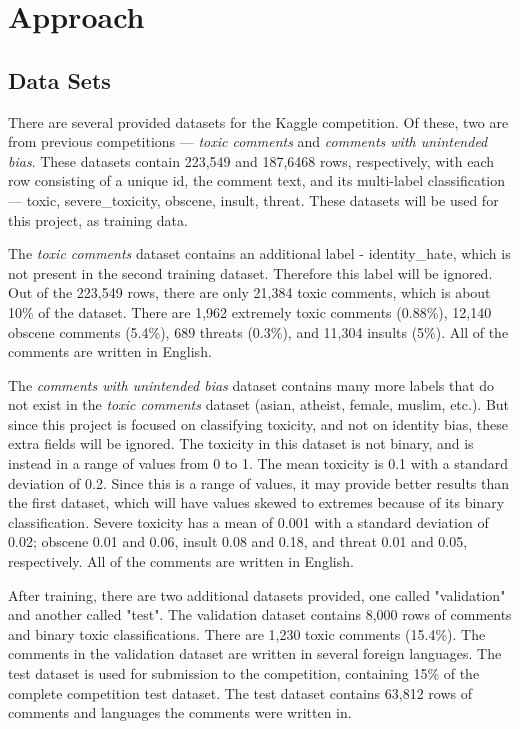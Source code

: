 \documentclass{article}
\begin{document}
\section{Approach}

\subsection{Data Sets}

There are several provided datasets for the Kaggle competition. Of these, two are from previous competitions --- \textit{toxic comments} and \textit{comments with unintended bias}. These datasets contain 223,549 and 187,6468 rows, respectively, with each row consisting of a unique id, the comment text, and its multi-label classification --- toxic, severe\_toxicity, obscene, insult, threat. These datasets will be used for this project, as training data.

The \textit{toxic comments} dataset contains an additional label - identity\_hate, which is not present in the second training dataset. Therefore this label will be ignored. Out of the 223,549 rows, there are only 21,384 toxic comments, which is about 10\% of the dataset. There are 1,962 extremely toxic comments (0.88\%), 12,140 obscene comments (5.4\%), 689 threats (0.3\%), and 11,304 insults (5\%). All of the comments are written in English.

The \textit{comments with unintended bias} dataset contains many more labels that do not exist in the \textit{toxic comments} dataset (asian, atheist, female, muslim, etc.). But since this project is focused on classifying toxicity, and not on identity bias, these extra fields will be ignored. The toxicity in this dataset is not binary, and is instead in a range of values from 0 to 1. The mean toxicity is 0.1 with a standard deviation of 0.2. Since this is a range of values, it may provide better results than the first dataset, which will have values skewed to extremes because of its binary classification. Severe toxicity has a mean of 0.001 with a standard deviation of 0.02; obscene 0.01 and 0.06, insult 0.08 and 0.18, and threat 0.01 and 0.05, respectively. All of the comments are written in English.

After training, there are two additional datasets provided, one called "validation" and another called "test". The validation dataset contains 8,000 rows of comments and binary toxic classifications. There are 1,230 toxic comments (15.4\%). The comments in the validation dataset are written in several foreign languages. The test dataset is used for submission to the competition, containing 15\% of the complete competition test dataset. The test dataset contains 63,812 rows of comments and languages the comments were written in.
\end{document}
